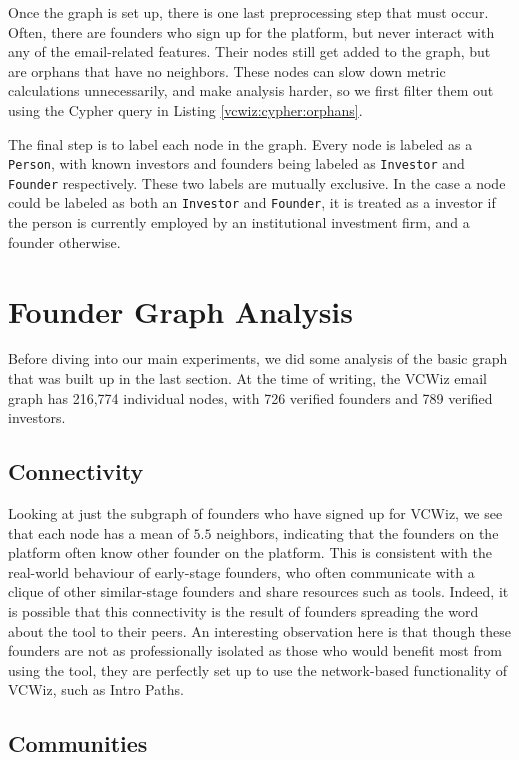 Once the graph is set up, there is one last preprocessing step that must occur. Often, there are founders who sign up for the platform, but never interact with any of the email-related features. Their nodes still get added to the graph, but are orphans that have no neighbors. These nodes can slow down metric calculations unnecessarily, and make analysis harder, so we first filter them out using the Cypher query in Listing \ref{vcwiz:cypher:orphans}.

The final step is to label each node in the graph. Every node is labeled as a \texttt{Person}, with known investors and founders being labeled as \texttt{Investor} and \texttt{Founder} respectively. These two labels are mutually exclusive. In the case a node could be labeled as both an \texttt{Investor} and \texttt{Founder}, it is treated as a investor if the person is currently employed by an institutional investment firm, and a founder otherwise.

\section{Founder Graph Analysis}

Before diving into our main experiments, we did some analysis of the basic graph that was built up in the last section. At the time of writing, the VCWiz email graph has 216,774 individual nodes, with 726 verified founders and 789 verified investors.

\subsection{Connectivity}

Looking at just the subgraph of founders who have signed up for VCWiz, we see that each node has a mean of $5.5$ neighbors, indicating that the founders on the platform often know other founder on the platform. This is consistent with the real-world behaviour of early-stage founders, who often communicate with a clique of other similar-stage founders and share resources such as tools. Indeed, it is possible that this connectivity is the result of founders spreading the word about the tool to their peers. An interesting observation here is that though these founders are not as professionally isolated as those who would benefit most from using the tool, they are perfectly set up to use the network-based functionality of VCWiz, such as Intro Paths.

\subsection{Communities}

